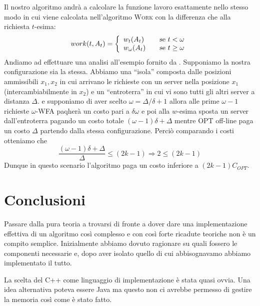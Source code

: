 \documentclass[a4paper, 10pt]{article}
\begin{document}
Il nostro algoritmo andrà a calcolare la funzione lavoro esattamente nello 
stesso modo in cui viene calcolata nell'algoritmo \textsc{Work} con la 
differenza che alla richiesta $t$-esima:
\[
    work(t, A_t) = 
    \left\{ \begin{array}{l l}
        w_t(A_t) & \quad \text{se } t < \omega\\
        w_\omega(A_t) & \quad \text{se } t \geq \omega \\
    \end{array}\right.
\]
Andiamo ad effettuare una analisi all'esempio fornito
da \cite{rudec}. Supponiamo la nostra configurazione sia la stessa. Abbiamo una 
``isola'' composta dalle posizioni ammissibili $x_1, x_2$ in cui arrivano le 
richieste con un server nella posizione $x_1$ (intercambiabilmente in $x_2$) 
e un ``entroterra'' in cui vi sono tutti gli altri server a distanza $\Delta$. 
e supponiamo di aver scelto $\omega = \Delta / \delta + 1$ allora alle prime 
$\omega - 1$ richieste $\omega$-WFA paqherà un costo pari a $\delta \omega$ e 
poi alla $w$-esima sposta un server dall'entroterra pagando un costo totale 
$(\omega - 1)\delta + \Delta$ mentre OPT off-line paga un costo $\Delta$ 
partendo dalla stessa configurazione. Perciò comparando i costi otteniamo che 
\[
    \frac{(\omega - 1) \delta + \Delta}{\Delta} \leq (2k -1) \Rightarrow 
    2  \leq (2k - 1)
\]
Dunque in questo scenario l'algoritmo paga un costo inferiore a $(2k - 1)C_{OPT}$. 

\section{Conclusioni}
Passare dalla pura teoria a trovarsi di fronte a dover dare una implementazione 
effettiva di un algoritmo così complesso e con così forte ricadute teoriche 
non è un compito semplice. Inizialmente abbiamo dovuto ragionare su quali 
fossero le componenti necessarie e, dopo aver isolato quello di cui 
abbisognavamo abbiamo implementato il tutto. 

La scelta del C++ come linguaggio di implementazione è stata quasi ovvia. Una 
idea alternativa poteva essere Java ma questo non ci avrebbe permesso di 
gestire la memoria così come è stato fatto.  



\end{document}
